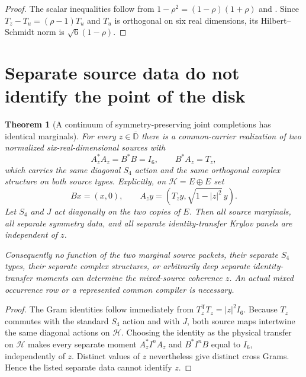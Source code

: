 \documentclass[11pt]{article}
\newtheorem{theorem}{Theorem}[section]
\theoremstyle{definition}
\theoremstyle{remark}
\begin{document}
\begin{proof}
The scalar inequalities follow from
$1-\rho^2=(1-\rho)(1+\rho)$ and
.  Since
$T_z-T_u=(\rho-1)T_u$ and $T_u$ is orthogonal on six real dimensions,
its Hilbert--Schmidt norm is $\sqrt6(1-\rho)$.
\end{proof}

\section{Separate source data do not identify the point of the disk}
\label{sec:v15-nonidentifiability}

\begin{theorem}[A continuum of symmetry-preserving joint completions has identical marginals]
\label{thm:v15-disk-nonidentifiability}
For every $z\in\overline{\mathbb D}$ there is a common-carrier realization of
two normalized six-real-dimensional sources with
\[
 A_z^*A_z=B^*B=I_6,
 \qquad B^*A_z=T_z,
\]
which carries the same diagonal $S_4$ action and the same orthogonal complex
structure on both source types.  Explicitly, on
$\mathcal H=E\oplus E$ set
\begin{equation}
 Bx=(x,0),
 \qquad
 A_zy=\left(T_zy,\sqrt{1-|z|^2}\,y\right).
 \label{eq:v15-z-realization}
\end{equation}
Let $S_4$ and $J$ act diagonally on the two copies of $E$.  Then all source
marginals, all separate symmetry data, and all separate identity-transfer
Krylov panels are independent of $z$.

Consequently no function of the two marginal source packets, their separate
$S_4$ types, their separate complex structures, or arbitrarily deep separate
identity-transfer moments can determine the mixed-source coherence $z$.
An actual mixed occurrence row or a represented common compiler is necessary.
\end{theorem}

\begin{proof}
The Gram identities follow immediately from
$T_z^{\mathsf T}T_z=|z|^2I_6$.  Because $T_z$ commutes with the standard
$S_4$ action and with $J$, both source maps intertwine the same diagonal
actions on $\mathcal H$.  Choosing the identity as the physical transfer on
$\mathcal H$ makes every separate moment
$A_z^*I^nA_z$ and $B^*I^nB$ equal to $I_6$, independently of $z$.  Distinct
values of $z$ nevertheless give distinct cross Grams.  Hence the listed
separate data cannot identify $z$.
\end{proof}
\end{document}
